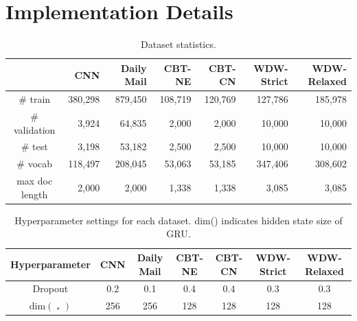 \documentclass[11pt,a4paper]{article}
\DeclareMathOperator{\bigru}{\overset{\longleftrightarrow}{\mathrm{GRU}}}
\begin{document}
\section{Implementation Details}
\label{app:implementation}
\begin{table}[t]
\centering
\caption{\small Dataset statistics.}
\label{tab:data}
\begin{tabular}{@{}crrrrrr@{}}
\toprule
 & \textbf{CNN} & \textbf{Daily Mail} & \textbf{CBT-NE} & \textbf{CBT-CN} & \textbf{WDW-Strict} & \textbf{WDW-Relaxed} \\ \midrule
\# train              & 380,298             & 879,450               & 108,719              & 120,769  & 	 127,786	&	185,978           \\
\# validation        & 3,924             & 64,835              & 2,000             & 2,000  	&	10,000	&	10,000           \\
\# test           &  3,198            & 53,182               & 2,500              & 2,500  	&	10,000	&	10,000            \\
\# vocab           & 118,497             & 208,045               & 53,063              & 53,185 	&	347,406	&	 308,602             \\ 
max doc length	& 2,000	&	2,000 &	1,338 &	1,338 & 3,085	&	3,085 \\ \bottomrule
\end{tabular}
\end{table}

\begin{table}[t]
\centering
\caption{\small Hyperparameter settings for each dataset. dim() indicates hidden state size of GRU.}
\label{tab:params}
\begin{tabular}{@{}ccccccc@{}}
\toprule
\textbf{Hyperparameter} & \textbf{CNN} & \textbf{Daily Mail} & \textbf{CBT-NE} & \textbf{CBT-CN} & \textbf{WDW-Strict} & \textbf{WDW-Relaxed} \\ \midrule
Dropout	&	0.2	&	0.1	&	0.4	&	0.4	&	0.3	&	0.3	\\
$\mathrm{dim}(\bigru_*)$ &	256	&	256	&	128	&	128	&	128	&	128	\\ \bottomrule
\end{tabular}
\end{table}
\end{document}
